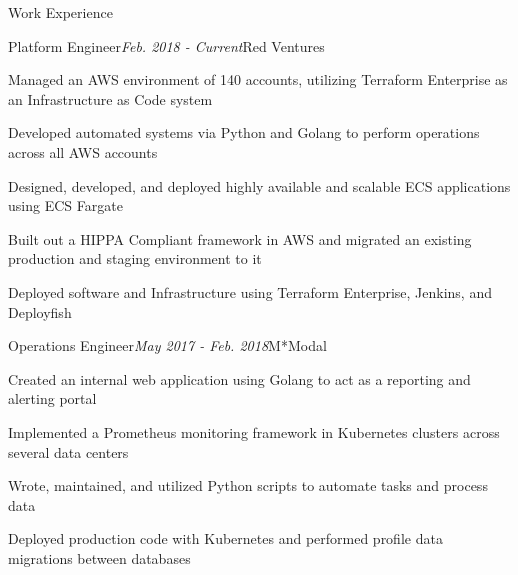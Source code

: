 \documentclass{resume} %
\begin{document}
\begin{rSection}{\vspace{-5pt}Work Experience}

\begin{rSubsection}{Platform Engineer}{\em Feb. 2018 - Current}{Red Ventures}{}
\item {Managed an AWS environment of 140 accounts, utilizing Terraform Enterprise as an Infrastructure as Code system}
\item {Developed automated systems via Python and Golang to perform operations across all AWS accounts}
\item {Designed, developed, and deployed highly available and scalable ECS applications using ECS Fargate}
\item {Built out a HIPPA Compliant framework in AWS and migrated an existing production and staging environment to it }
\item {Deployed software and Infrastructure using Terraform Enterprise, Jenkins, and Deployfish}

\end{rSubsection}



\begin{rSubsection}{Operations Engineer}{\em May 2017 - Feb. 2018}{M*Modal}{}
\item {Created an internal web application using Golang to act as a reporting and alerting portal}
\item {Implemented a Prometheus monitoring framework in Kubernetes clusters across several data centers}
\item {Wrote, maintained, and utilized Python scripts to automate tasks and process data}
\item {Deployed production code with Kubernetes and performed profile data migrations between databases}
\end{rSubsection}

\end{rSection}
\end{document}
